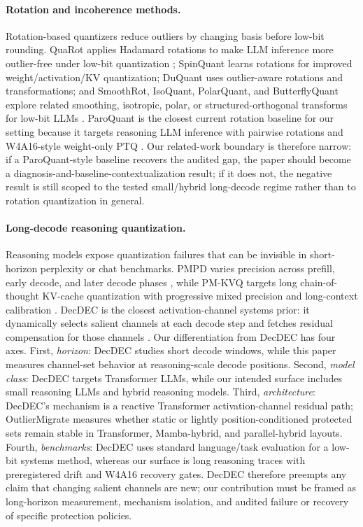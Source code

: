 \paragraph{Rotation and incoherence methods.}
Rotation-based quantizers reduce outliers by changing basis before low-bit
rounding.  QuaRot applies Hadamard rotations to make LLM inference more
outlier-free under low-bit quantization \citep{ashkboos2024quarot}; SpinQuant
learns rotations for improved weight/activation/KV quantization; DuQuant uses
outlier-aware rotations and transformations; and SmoothRot, IsoQuant,
PolarQuant, and ButterflyQuant explore related smoothing, isotropic, polar, or
structured-orthogonal transforms for low-bit LLMs
\citep{liu2024spinquant,lin2024duquant,huang2025smoothrot,kim2025isoquant,zhang2025polarquant,li2025butterflyquant}.
ParoQuant is the closest current rotation baseline for our setting because it
targets reasoning LLM inference with pairwise rotations and W4A16-style
weight-only PTQ \citep{liang2025paroquant}.  Our related-work boundary is
therefore narrow: if a ParoQuant-style baseline recovers the audited gap, the
paper should become a diagnosis-and-baseline-contextualization result; if it
does not, the negative result is still scoped to the tested small/hybrid
long-decode regime rather than to rotation quantization in general.

\paragraph{Long-decode reasoning quantization.}
Reasoning models expose quantization failures that can be invisible in
short-horizon perplexity or chat benchmarks.  PMPD varies precision across
prefill, early decode, and later decode phases \citep{chen2025pmpd}, while
PM-KVQ targets long chain-of-thought KV-cache quantization with progressive
mixed precision and long-context calibration \citep{liu2025pmkvq}.  DecDEC is
the closest activation-channel systems prior: it dynamically selects salient
channels at each decode step and fetches residual compensation for those
channels \citep{park2025decdec}.  Our differentiation from DecDEC has four
axes.  First, \emph{horizon}: DecDEC studies short decode windows, while this
paper measures channel-set behavior at reasoning-scale decode positions.
Second, \emph{model class}: DecDEC targets Transformer LLMs, while our
intended surface includes small reasoning LLMs and hybrid reasoning models.
Third, \emph{architecture}: DecDEC's mechanism is a reactive Transformer
activation-channel residual path; OutlierMigrate measures whether static or
lightly position-conditioned protected sets remain stable in Transformer,
Mamba-hybrid, and parallel-hybrid layouts.  Fourth, \emph{benchmarks}: DecDEC
uses standard language/task evaluation for a low-bit systems method, whereas
our surface is long reasoning traces with preregistered drift and W4A16
recovery gates.  DecDEC therefore preempts any claim that changing salient
channels are new; our contribution must be framed as long-horizon measurement,
mechanism isolation, and audited failure or recovery of specific protection
policies.

